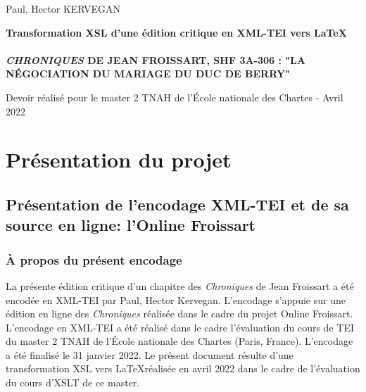\documentclass[12pt, a4paper]{article}
\begin{document}
            
            
            \begin{titlepage}
            \begin{center}
            \large
            Paul, Hector KERVEGAN
            
            \Large
            \vfill
            \textbf{Transformation XSL d'une édition critique en XML-TEI vers \LaTeX}
            \\~\\
            \textbf{\textit{CHRONIQUES} DE JEAN FROISSART, SHF 3A-306 : "LA NÉGOCIATION DU MARIAGE DU DUC DE BERRY"}
            \vfill
            
            \large	
            \vfill Devoir réalisé pour le master 2 TNAH de l'École nationale des Chartes - Avril 2022
            \end{center}
            \end{titlepage}
            
            
            
                \section{Présentation du projet}
                \subsection{Présentation de l'encodage XML-TEI et de sa source en ligne: l'Online Froissart}
                
        
        
        \subsubsection{À propos du présent encodage}
        La présente édition critique d'un chapitre des \textit{Chroniques} de Jean Froissart a été encodée en XML-TEI par Paul, Hector Kervegan. L'encodage s'appuie sur une édition en ligne des \textit{Chroniques} 
            réalisée dans le cadre du projet Online Froissart.\\ \indent L'encodage en XML-TEI a été 
            réalisé dans le cadre l'évaluation du cours de TEI du master 2 TNAH de l'École nationale des Chartes (Paris, France). L'encodage a été finalisé le 31 janvier 2022. Le présent document résulte d'une transformation XSL vers \LaTeX  réalisée
            en avril 2022 dans le cadre de l'évaluation du cours d'XSLT de ce master.
        
\end{document}
